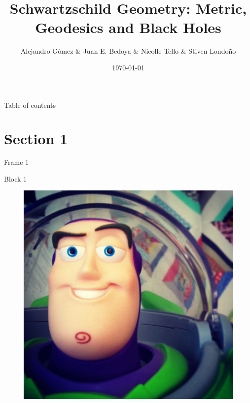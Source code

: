 \documentclass[xcolor=dvipsnames]{beamer}
\title[Schwartzschild geometry]{Schwartzschild Geometry: Metric, Geodesics and Black Holes}
\date{\today}
\author[Universidad del Valle]{Alejandro Gómez \& Juan E. Bedoya \& Nicolle Tello \& Stiven Londoño}
\institute[]{Universidad del Valle \\ Departamento de física}
\begin{document}
	
	\begin{frame}
		\titlepage
	\end{frame}
	
	\begin{frame}{Table of contents}
    \tableofcontents
	\end{frame}
	
	
\section{Section 1}

\begin{frame}{Frame 1}

\begin{block}{Block 1}
\cite{hobson_efstathiou_lasenby_2006}    
\end{block}

\begin{figure}
    \centering
    \includegraphics[width=0.4 \textwidth]{Presentations/Images/sample.jpg}
\end{figure}
    
\end{frame}
\end{document}
